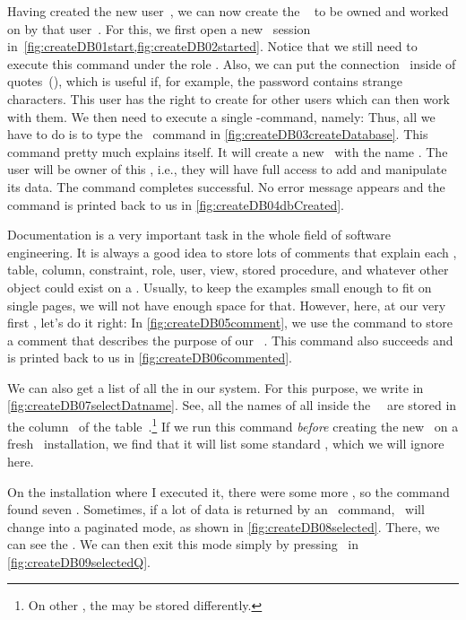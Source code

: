 %
%
%
%
Having created the new user~, we can now create the \db\  to be owned and worked on by that user~.
For this, we first open a new \psql\ session in~\cref{fig:createDB01start,fig:createDB02started}.
Notice that we still need to execute this command under the  role .
Also, we can put the connection~ inside of quotes~(), which is useful if, for example, the password contains strange characters.
This user has the right to create  for other users which can then work with them.
We then need to execute a single \sql-command, namely:%
%
%
%
Thus, all we have to do is to type the \sql\ command  in \cref{fig:createDB03createDatabase}.
This command pretty much explains itself.
It will create a new \db\ with the name .
The user  will be owner of this \db, i.e., they will have full access to add and manipulate its data.
The command completes successful.
No error message appears and the command is printed back to us in \cref{fig:createDB04dbCreated}.

Documentation is a very important task in the whole field of software engineering.
It is always a good idea to store lots of comments that explain each \db, table, column, constraint, role, user, view, stored procedure, and whatever other object could exist on a \dbms.
Usually, to keep the examples small enough to fit on single pages, we will not have enough space for that.
However, here, at our very first \db, let's do it right:
In \cref{fig:createDB05comment}, we use the  command to store a comment that describes the purpose of our \db\ .
This command also succeeds and is printed back to us in \cref{fig:createDB06commented}.%
%
\begin{sloppypar}%
We can also get a list of all the  in our system.
For this purpose, we write  in \cref{fig:createDB07selectDatname}.
See, all the names of all  inside the \postgresql\ \dbms\ are stored in the column~ of the table~.\footnote{%
On other , the  may be stored differently.}
If we run this command \emph{before} creating the new \db\ on a fresh \postgresql\ installation, we find that it will list some standard , which we will ignore here.%
\end{sloppypar}%
%
On the installation where I executed it, there were some more , so the command found seven .
Sometimes, if a lot of data is returned by an \sql\ command, \psql\ will change into a paginated mode, as shown in \cref{fig:createDB08selected}.
There, we can see the .
We can then exit this mode simply by pressing~ in \cref{fig:createDB09selectedQ}.


